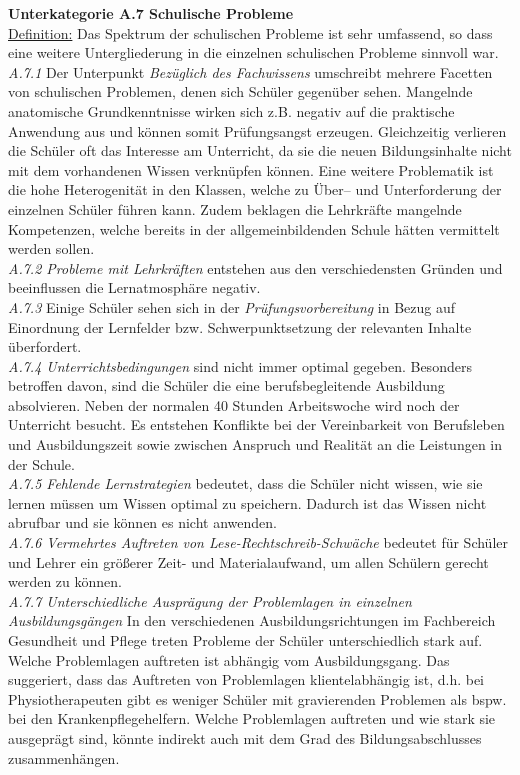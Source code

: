 \textbf{Unterkategorie A.7 Schulische Probleme}\\
\underline{Definition:} Das Spektrum der schulischen Probleme ist sehr umfassend, so dass eine weitere Untergliederung in die einzelnen schulischen Probleme sinnvoll war.\\
\textit{A.7.1} Der Unterpunkt \textit{Bezüglich des Fachwissens} umschreibt mehrere Facetten von schulischen Problemen, denen sich Schüler gegenüber sehen. Mangelnde anatomische Grundkenntnisse wirken sich z.B. negativ auf die praktische Anwendung aus und können somit Prüfungsangst erzeugen. Gleichzeitig verlieren die Schüler oft das Interesse am Unterricht, da sie die neuen Bildungsinhalte nicht mit dem vorhandenen Wissen verknüpfen können. Eine weitere Problematik ist die hohe Heterogenität in den Klassen, welche zu Über-- und Unterforderung der einzelnen Schüler führen kann. Zudem beklagen die Lehrkräfte mangelnde Kompetenzen, welche bereits in der allgemeinbildenden Schule hätten vermittelt werden sollen.\\
\textit{A.7.2 Probleme mit Lehrkräften} entstehen aus den verschiedensten Gründen und beeinflussen die Lernatmosphäre negativ.\\
\textit{A.7.3} Einige Schüler sehen sich in der \textit{Prüfungsvorbereitung} in Bezug auf Einordnung der Lernfelder bzw. Schwerpunktsetzung der relevanten Inhalte überfordert.\\
\textit{A.7.4 Unterrichtsbedingungen} sind nicht immer optimal gegeben. Besonders betroffen davon, sind die Schüler die eine berufsbegleitende Ausbildung absolvieren. Neben der normalen 40 Stunden Arbeitswoche wird noch der Unterricht besucht. Es entstehen Konflikte bei der Vereinbarkeit von Berufsleben und Ausbildungszeit sowie zwischen Anspruch und Realität an die Leistungen in der Schule. \\
\textit{A.7.5 Fehlende Lernstrategien} bedeutet, dass die Schüler nicht wissen, wie sie lernen müssen um Wissen optimal zu speichern. Dadurch ist das Wissen nicht abrufbar und sie können es nicht anwenden.\\
\textit{A.7.6 Vermehrtes Auftreten von Lese-Rechtschreib-Schwäche} bedeutet für Schüler und Lehrer ein größerer Zeit- und Materialaufwand, um allen Schülern gerecht werden zu können.\\
\textit{A.7.7 Unterschiedliche Ausprägung der Problemlagen in einzelnen Ausbildungsgängen}
In den verschiedenen Ausbildungsrichtungen im Fachbereich Gesundheit und Pflege treten Probleme der Schüler unterschiedlich stark auf. Welche Problemlagen auftreten ist abhängig vom Ausbildungsgang. Das suggeriert, dass das Auftreten von Problemlagen klientelabhängig ist, d.h. bei Physiotherapeuten gibt es weniger Schüler mit gravierenden Problemen als bspw. bei den Krankenpflegehelfern. Welche Problemlagen auftreten und wie stark sie ausgeprägt sind, könnte indirekt auch mit dem Grad des Bildungsabschlusses zusammenhängen.\\
